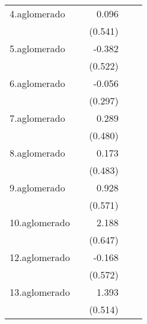 {\begin{longtable}{l*{4}{D{.}{.}{-1}}}
\addlinespace
4.aglomerado&                     &       0.096         &                     &                     \\
            &                     &     (0.541)         &                     &                     \\
\addlinespace
5.aglomerado&                     &      -0.382         &                     &                     \\
            &                     &     (0.522)         &                     &                     \\
\addlinespace
6.aglomerado&                     &      -0.056         &                     &                     \\
            &                     &     (0.297)         &                     &                     \\
\addlinespace
7.aglomerado&                     &       0.289         &                     &                     \\
            &                     &     (0.480)         &                     &                     \\
\addlinespace
8.aglomerado&                     &       0.173         &                     &                     \\
            &                     &     (0.483)         &                     &                     \\
\addlinespace
9.aglomerado&                     &       0.928         &                     &                     \\
            &                     &     (0.571)         &                     &                     \\
\addlinespace
10.aglomerado&                     &       2.188\sym{***}&                     &                     \\
            &                     &     (0.647)         &                     &                     \\
\addlinespace
12.aglomerado&                     &      -0.168         &                     &                     \\
            &                     &     (0.572)         &                     &                     \\
\addlinespace
13.aglomerado&                     &       1.393\sym{**} &                     &                     \\
            &                     &     (0.514)         &                     &                     \\

\end{longtable}}
